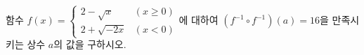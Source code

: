 \hspace*{2mm}\begin{minipage}[t]{\dimexpr\linewidth-2mm\relax}\vspace{0pt}
함수 $f(x)=\begin{cases} 2-\sqrt{x} & (x\ge 0) \\ 2+\sqrt{-2x} & (x<0) \end{cases}$에 대하여 $(f^{-1}\circ f^{-1})(a)=16$을 만족시키는 상수 $a$의 값을 구하시오.\end{minipage}
